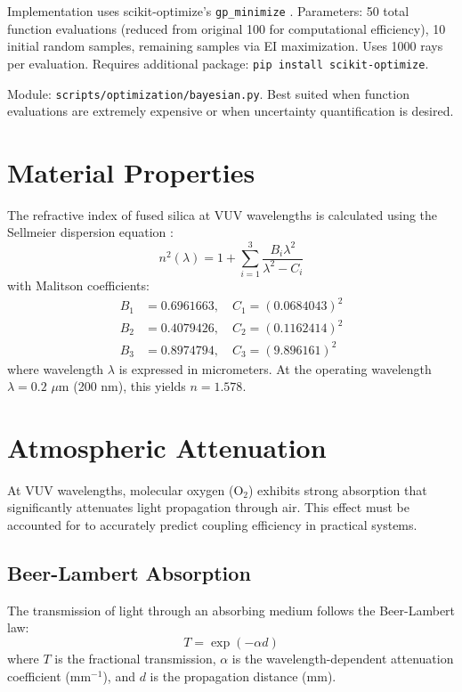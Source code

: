 Implementation uses scikit-optimize's \texttt{gp\_minimize} \cite{skopt}. Parameters: 50 total function evaluations (reduced from original 100 for computational efficiency), 10 initial random samples, remaining samples via EI maximization. Uses 1000 rays per evaluation. Requires additional package: \texttt{pip install scikit-optimize}.

Module: \texttt{scripts/optimization/bayesian.py}. Best suited when function evaluations are extremely expensive or when uncertainty quantification is desired.

\section{Material Properties}

The refractive index of fused silica at VUV wavelengths is calculated using the Sellmeier dispersion equation \cite{malitson1965}:
\begin{equation}
n^2(\lambda) = 1 + \sum_{i=1}^{3} \frac{B_i\lambda^2}{\lambda^2 - C_i}
\end{equation}
with Malitson coefficients:
\begin{align*}
B_1 &= 0.6961663, \quad C_1 = (0.0684043)^2 \\
B_2 &= 0.4079426, \quad C_2 = (0.1162414)^2 \\
B_3 &= 0.8974794, \quad C_3 = (9.896161)^2
\end{align*}
where wavelength $\lambda$ is expressed in micrometers. At the operating wavelength $\lambda = 0.2$ $\mu$m (200 nm), this yields $n = 1.578$.

\section{Atmospheric Attenuation}

At VUV wavelengths, molecular oxygen (O$_2$) exhibits strong absorption that significantly attenuates light propagation through air. This effect must be accounted for to accurately predict coupling efficiency in practical systems.

\subsection{Beer-Lambert Absorption}

The transmission of light through an absorbing medium follows the Beer-Lambert law:
\begin{equation}
T = \exp(-\alpha d)
\end{equation}
where $T$ is the fractional transmission, $\alpha$ is the wavelength-dependent attenuation coefficient (mm$^{-1}$), and $d$ is the propagation distance (mm).


